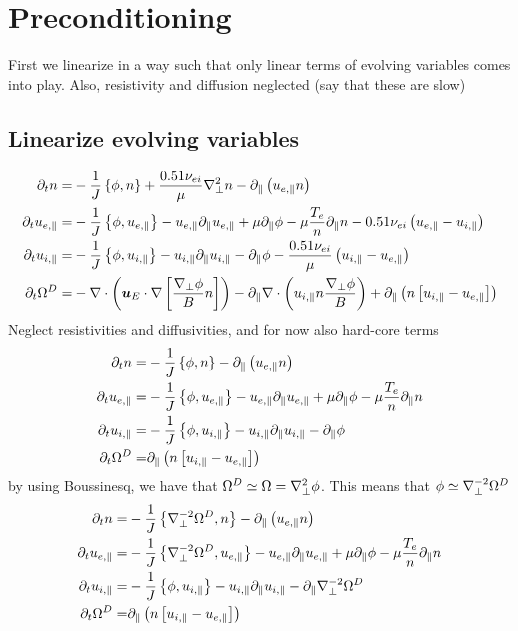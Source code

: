 \section{Preconditioning}
First we linearize in a way such that only linear terms of evolving variables
comes into play. Also, resistivity and diffusion neglected (say that these are
slow)

\subsection{Linearize evolving variables}
\begin{align*}
 \partial_t n
 =&
 -\frac{1}{J}\L\{\phi,n\R\}
 +\frac{0.51\nu_{ei}}{\mu} \grad_\perp^2 n
 -\partial_\| \L(u_{e,\|}n\R)
\\
%
%
%
\partial_t u_{e,\|}
 =&
 -\frac{1}{J}\L\{\phi,u_{e,\|}\R\}
 - u_{e,\|} \partial_\| u_{e,\|}
 + \mu \partial_\| \phi
 - \mu \frac{T_e }{n}\partial_\|   n
 - 0.51 \nu_{ei} \L(u_{e,\|}-u_{i,\|}\R)
\\
%
%
%
\partial_t u_{i,\|}
 =&
 -\frac{1}{J}\L\{\phi,u_{i,\|}\R\}
 - u_{i,\|} \partial_\| u_{i,\|}
 - \partial_\|\phi
 - \frac{ 0.51 \nu_{ei} }{ \mu } \L(u_{i,\|}-u_{e,\|}\R)
\\
%
%
%
  \partial_t \Om^D
  =&
  - \div \L( \ve{u}_E\cdot\nabla \L[\frac{\grad_\perp \phi}{B}n \R] \R)
  - \partial_\|\div \L( u_{i,\|}n \frac{\grad_\perp \phi}{B}\R)
 + \partial_\| \L(n\L[ u_{i,\|} - u_{e,\|} \R]\R)
\end{align*}
Neglect resistivities and diffusivities, and for now also hard-core terms
\begin{align*}
 \partial_t n
 =&
 -\frac{1}{J}\L\{\phi,n\R\}
 -\partial_\| \L(u_{e,\|}n\R)
\\
%
%
%
\partial_t u_{e,\|}
 =&
 -\frac{1}{J}\L\{\phi,u_{e,\|}\R\}
 - u_{e,\|} \partial_\| u_{e,\|}
 + \mu \partial_\| \phi
 - \mu \frac{T_e}{n}\partial_\|  n
\\
%
%
%
\partial_t u_{i,\|}
 =&
 -\frac{1}{J}\L\{\phi,u_{i,\|}\R\}
 - u_{i,\|} \partial_\| u_{i,\|}
 - \partial_\|\phi
\\
%
%
%
  \partial_t \Om^D
  =&
  \partial_\| \L(n\L[ u_{i,\|} - u_{e,\|} \R]\R)
\end{align*}
by using Boussinesq, we have that $\Omega^D\simeq\Omega=\nabla_\perp^2\phi$. This
means that $\phi\simeq\nabla_\perp^{-2}\Omega^D$
\begin{align*}
 \partial_t n
 =&
 -\frac{1}{J}\L\{\grad_\perp^{-2}\Om^D,n\R\}
 -\partial_\| \L(u_{e,\|}n\R)
\\
%
%
%
\partial_t u_{e,\|}
 =&
 -\frac{1}{J}\L\{\grad_\perp^{-2}\Om^D,u_{e,\|}\R\}
 - u_{e,\|} \partial_\| u_{e,\|}
 + \mu \partial_\| \phi
 - \mu \frac{T_e  }{n}\partial_\|  n
\\
%
%
%
\partial_t u_{i,\|}
 =&
 -\frac{1}{J}\L\{\phi,u_{i,\|}\R\}
 - u_{i,\|} \partial_\| u_{i,\|}
 - \partial_\|\grad_\perp^{-2}\Om^D
\\
%
%
%
  \partial_t \Om^D
  =&
  \partial_\| \L(n\L[ u_{i,\|} - u_{e,\|} \R]\R)
\end{align*}
